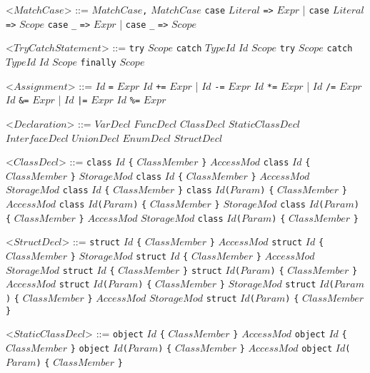 \documentclass{article}
\newcommand{\gtext}[1]{<$#1$>}
\newcommand{\glit}[1]{\texttt{#1}}
\begin{document}
\begin{grammar}
	\gtext{MatchCase} ::= $MatchCase$\glit{,} $MatchCase$
	\alt \glit{case} $Literal$ \glit{=>} $Expr$ | \glit{case} $Literal$ \glit{=>} $Scope$
	\alt \glit{case} \glit{_} \glit{=>} $Expr$ | \glit{case} \glit{_} \glit{=>} $Scope$

	\newpage	
	
	\gtext{TryCatchStatement} ::= \glit{try} $Scope$ \glit{catch} $TypeId$ $Id$ $Scope$  
	\alt \glit{try} $Scope$ \glit{catch} $TypeId$ $Id$ $Scope$ \glit{finally} $Scope$

	\gtext{Assignment} ::= $Id$ \glit{=} $Expr$
	\alt $Id$ \glit{+=} $Expr$ | $Id$ \glit{-=} $Expr$
	\alt $Id$ \glit{*=} $Expr$ | $Id$ \glit{/=} $Expr$
	\alt $Id$ \glit{\&=} $Expr$ | $Id$ \glit{|=} $Expr$
	\alt $Id$ \glit{\%=} $Expr$
	
	\gtext{Declaration} ::= $VarDecl$
	\alt $FuncDecl$
	\alt $ClassDecl$
	\alt $StaticClassDecl$
	\alt $InterfaceDecl$
	\alt $UnionDecl$
	\alt $EnumDecl$
	\alt $StructDecl$
	
	\gtext{ClassDecl} ::= \glit{class} $Id$ \glit{\{} $ClassMember$ \glit{\}}
	\alt $AccessMod$ \glit{class} $Id$ \glit{\{} $ClassMember$ \glit{\}}
	\alt $StorageMod$ \glit{class} $Id$ \glit{\{} $ClassMember$ \glit{\}}
	\alt $AccessMod$ $StorageMod$ \glit{class} $Id$ \glit{\{} $ClassMember$ \glit{\}}
	\alt \glit{class} $Id$\glit{(}$Param$\glit{)} \glit{\{} $ClassMember$ \glit{\}}
	\alt $AccessMod$ \glit{class} $Id$\glit{(}$Param$\glit{)} \glit{\{} $ClassMember$ \glit{\}}
	\alt $StorageMod$ \glit{class} $Id$\glit{(}$Param$\glit{)} \glit{\{} $ClassMember$ \glit{\}}
	\alt $AccessMod$ $StorageMod$ \glit{class} $Id$\glit{(}$Param$\glit{)} \glit{\{} $ClassMember$ \glit{\}}
	
	\gtext{StructDecl} ::= \glit{struct} $Id$ \glit{\{} $ClassMember$ \glit{\}}
	\alt $AccessMod$ \glit{struct} $Id$ \glit{\{} $ClassMember$ \glit{\}}
	\alt $StorageMod$ \glit{struct} $Id$ \glit{\{} $ClassMember$ \glit{\}}
	\alt $AccessMod$ $StorageMod$ \glit{struct} $Id$ \glit{\{} $ClassMember$ \glit{\}}
	\alt \glit{struct} $Id$\glit{(}$Param$\glit{)} \glit{\{} $ClassMember$ \glit{\}}
	\alt $AccessMod$ \glit{struct} $Id$\glit{(}$Param$\glit{)} \glit{\{} $ClassMember$ \glit{\}}
	\alt $StorageMod$ \glit{struct} $Id$\glit{(}$Param$\glit{)} \glit{\{} $ClassMember$ \glit{\}}
	\alt $AccessMod$ $StorageMod$ \glit{struct} $Id$\glit{(}$Param$\glit{)} \glit{\{} $ClassMember$ \glit{\}}
	
	\gtext{StaticClassDecl} ::= \glit{object} $Id$ \glit{\{} $ClassMember$ \glit{\}}
	\alt $AccessMod$ \glit{object} $Id$ \glit{\{} $ClassMember$ \glit{\}}
	\alt \glit{object} $Id$\glit{(}$Param$\glit{)} \glit{\{} $ClassMember$ \glit{\}}
	\alt $AccessMod$ \glit{object} $Id$\glit{(}$Param$\glit{)} \glit{\{} $ClassMember$ \glit{\}}
	

\end{grammar}
\end{document}

